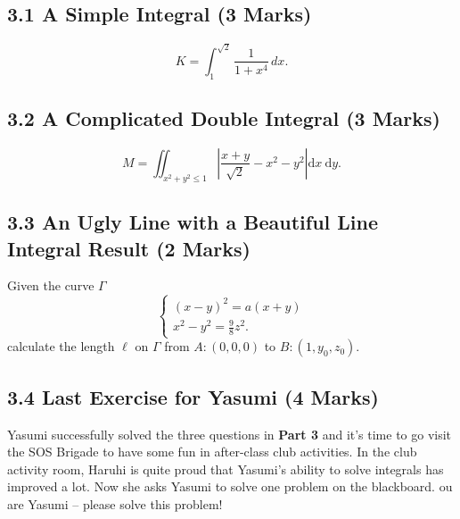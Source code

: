 \documentclass[12pt]{article}
\begin{document}
\subsection*{3.1 A Simple Integral (3 Marks)}
\begin{equation*}
    K = \int^{\sqrt{2}}_{1} \frac{1}{1 + x^4}\,dx. 
\end{equation*}

\subsection*{3.2 A Complicated Double Integral (3 Marks)}
\begin{equation*}
    M=\iint_{x^{2}+y^{2} \leqslant 1}\left|\frac{x+y}{\sqrt{2}}-x^{2}-y^{2}\right| \mathrm{d} x \mathrm{~d} y.
\end{equation*}

\subsection*{3.3 An Ugly Line with a Beautiful Line Integral Result (2 Marks)}
Given the curve $\varGamma$
\begin{equation*}
    \left\{\begin{array}{l}
(x-y)^{2}=a(x+y) \\
x^{2}-y^{2}=\frac{9}{8} z^{2}. 
\end{array}\right.
\end{equation*}
calculate the length $\ell$ on $\varGamma$ from $A\colon\left(0, 0, 0\right)$ to $B\colon\left(1, y_0, z_0\right)$. 

\subsection*{3.4 Last Exercise for Yasumi (4 Marks)}

Yasumi successfully solved the three questions in \textbf{Part 3} and it's time to go visit the SOS Brigade to have some fun in after-class club activities. In the club activity room, Haruhi is quite proud that Yasumi's ability to solve integrals has improved a lot. Now she asks Yasumi to solve one problem on the blackboard. ou are Yasumi -- please solve this problem!
\end{document}
